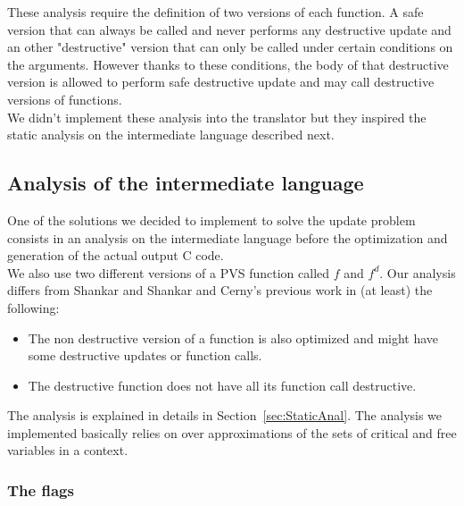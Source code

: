 \documentclass[12pt,a4paper]{article}
\begin{document}
These analysis require the definition of two versions of each function. A safe version that can always be called and never  performs any destructive update and an other "destructive" version that can only be called under certain conditions on the arguments. However thanks to these conditions, the body of that destructive version is allowed to perform safe destructive update and may call destructive versions of functions.\\

We didn't implement these analysis into the translator but they inspired the static analysis on the intermediate language described next.


\subsection{Analysis of the intermediate language}
\label{Canalysis}

One of the solutions we decided to implement to solve the update problem  consists in an analysis on the intermediate language before the optimization and generation of the actual output C code.\\

We also use two different versions of a PVS function called $f$ and $f^d$. Our analysis differs from Shankar and Shankar and Cerny's previous work in (at least) the following:
\begin{itemize}
\item The non destructive version of a function is also optimized and might have some destructive updates or function calls.
\item The destructive function does not have all its function call destructive.
\end{itemize}

The analysis is explained in details in Section~\ref{sec:StaticAnal}. The analysis we implemented basically relies on over approximations of the sets of critical and free variables in a context.

\subsubsection*{The flags}
\end{document}
